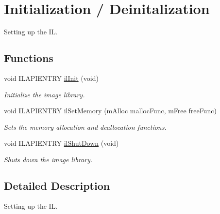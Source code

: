 \hypertarget{group__setup}{\section{Initialization / Deinitalization}
\label{group__setup}
}


Setting up the I\+L.  


\subsection*{Functions}
\begin{DoxyCompactItemize}
\item 
void I\+L\+A\+P\+I\+E\+N\+T\+R\+Y \hyperlink{group__setup_gac4eeea2ec690f1c38ba24c9a0b284811}{il\+Init} (void)
\begin{DoxyCompactList}\small\item\em Initialize the image library. \end{DoxyCompactList}\item 
void I\+L\+A\+P\+I\+E\+N\+T\+R\+Y \hyperlink{group__setup_ga5cb1805053b3380b59b05655c71b8b45}{il\+Set\+Memory} (m\+Alloc malloc\+Func, m\+Free free\+Func)
\begin{DoxyCompactList}\small\item\em Sets the memory allocation and deallocation functions. \end{DoxyCompactList}\item 
\hypertarget{group__setup_gaf094c9f19b5e285c599e3fa3d7ea2514}{void I\+L\+A\+P\+I\+E\+N\+T\+R\+Y \hyperlink{group__setup_gaf094c9f19b5e285c599e3fa3d7ea2514}{il\+Shut\+Down} (void)}\label{group__setup_gaf094c9f19b5e285c599e3fa3d7ea2514}

\begin{DoxyCompactList}\small\item\em Shuts down the image library. \end{DoxyCompactList}\end{DoxyCompactItemize}


\subsection{Detailed Description}
Setting up the I\+L. 



